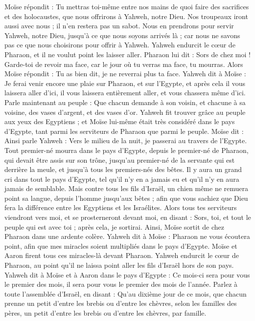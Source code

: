 \begin{multicols}{2}
Moïse répondit : Tu mettras toi-même entre nos mains de quoi faire des sacrifices et des holocaustes, que nous offrirons à Yahweh, notre Dieu.
Nos troupeaux iront aussi avec nous ; il n'en restera pas un sabot. Nous en prendrons pour servir Yahweh, notre Dieu, jusqu’à ce que nous soyons arrivés là ; car nous ne savons pas ce que nous choisirons pour offrir à Yahweh.
Yahweh endurcit le cœur de Pharaon, et il ne voulut point les laisser aller.
Pharaon lui dit : Sors de chez moi ! Garde-toi de revoir ma face, car le jour où tu verras ma face, tu mourras.
Alors Moïse répondit : Tu as bien dit, je ne reverrai plus ta face\FTNT{}.
\VerseOne{}Yahweh dit à Moïse : Je ferai venir encore une plaie sur Pharaon, et sur l'Egypte, et après cela il vous laissera aller d'ici, il vous laissera entièrement aller, et vous chassera même d’ici.
Parle maintenant au peuple : Que chacun demande à son voisin, et chacune à sa voisine, des vases d'argent, et des vases d'or.
Yahweh fit trouver grâce au peuple aux yeux des Egyptiens ; et Moïse lui-même était très considéré dans le pays d'Egypte, tant parmi les serviteurs de Pharaon que parmi le peuple.
Moïse dit : Ainsi parle Yahweh : Vers le milieu de la nuit, je passerai au travers de l'Egypte.
Tout premier-né mourra dans le pays d'Egypte, depuis le premier-né de Pharaon, qui devait être assis sur son trône, jusqu'au premier-né de la servante qui est derrière la meule, et jusqu’à tous les premiers-nés des bêtes.
Il y aura un grand cri dans tout le pays d'Egypte, tel qu'il n'y en a jamais eu et qu’il n'y en aura jamais de semblable.
Mais contre tous les fils d'Israël, un chien même ne remuera point sa langue, depuis l'homme jusqu’aux bêtes ; afin que vous sachiez que Dieu fera la différence entre les Egyptiens et les Israélites.
Alors tous tes serviteurs viendront vers moi, et se prosterneront devant moi, en disant : Sors, toi, et tout le peuple qui est avec toi ; après cela, je sortirai. Ainsi, Moïse sortit de chez Pharaon dans une ardente colère.
Yahweh dit à Moïse : Pharaon ne vous écoutera point, afin que mes miracles soient multipliés dans le pays d'Egypte.
Moïse et Aaron firent tous ces miracles-là devant Pharaon. Yahweh endurcit le cœur de Pharaon, au point qu'il ne laissa point aller les fils d'Israël hors de son pays.
\VerseOne{}Yahweh dit à Moïse et à Aaron dans le pays d'Egypte :
Ce mois-ci sera pour vous le premier des mois, il sera pour vous le premier des mois de l'année.
Parlez à toute l'assemblée d'Israël, en disant : Qu'au dixième jour de ce mois, que chacun prenne un petit d'entre les brebis ou d'entre les chèvres, selon les familles des pères, un petit d'entre les brebis ou d'entre les chèvres, par famille.

\end{multicols}
